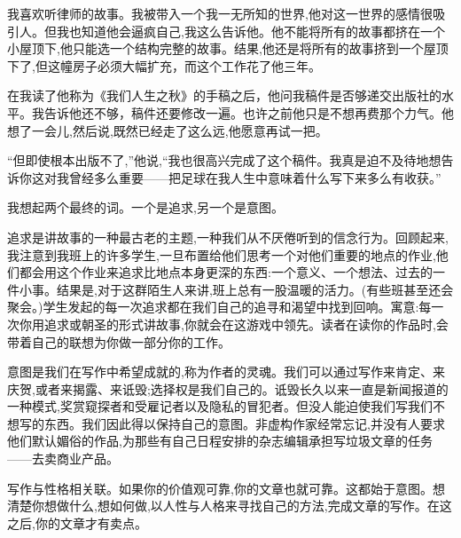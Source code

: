 我喜欢听律师的故事。我被带入一个我一无所知的世界,他对这一世界的感情很吸引人。但我也知道他会逼疯自己,我这么告诉他。他不能将所有的故事都挤在一个小屋顶下,他只能选一个结构完整的故事。结果,他还是将所有的故事挤到一个屋顶下了,但这幢房子必须大幅扩充，而这个工作花了他三年。

在我读了他称为《我们人生之秋》的手稿之后，他问我稿件是否够递交出版社的水平。我告诉他还不够，稿件还要修改一遍。也许之前他只是不想再费那个力气。他想了一会儿,然后说,既然已经走了这么远,他愿意再试一把。

“但即使根本出版不了,”他说,“我也很高兴完成了这个稿件。我真是迫不及待地想告诉你这对我曾经多么重要——把足球在我人生中意味着什么写下来多么有收获。”

我想起两个最终的词。一个是追求,另一个是意图。

追求是讲故事的一种最古老的主题,一种我们从不厌倦听到的信念行为。回顾起来,我注意到我班上的许多学生,一旦布置给他们思考一个对他们重要的地点的作业,他们都会用这个作业来追求比地点本身更深的东西:一个意义、一个想法、过去的一件小事。结果是,对于这群陌生人来讲,班上总有一股温暖的活力。(有些班甚至还会聚会。)学生发起的每一次追求都在我们自己的追寻和渴望中找到回响。寓意:每一次你用追求或朝圣的形式讲故事,你就会在这游戏中领先。读者在读你的作品时,会带着自己的联想为你做一部分你的工作。



意图是我们在写作中希望成就的,称为作者的灵魂。我们可以通过写作来肯定、来庆贺,或者来揭露、来诋毁;选择权是我们自己的。诋毁长久以来一直是新闻报道的一种模式,奖赏窥探者和受雇记者以及隐私的冒犯者。但没人能迫使我们写我们不想写的东西。我们因此得以保持自己的意图。非虚构作家经常忘记,并没有人要求他们默认媚俗的作品,为那些有自己日程安排的杂志编辑承担写垃圾文章的任务——去卖商业产品。

写作与性格相关联。如果你的价值观可靠,你的文章也就可靠。这都始于意图。想清楚你想做什么,想如何做,以人性与人格来寻找自己的方法,完成文章的写作。在这之后,你的文章才有卖点。